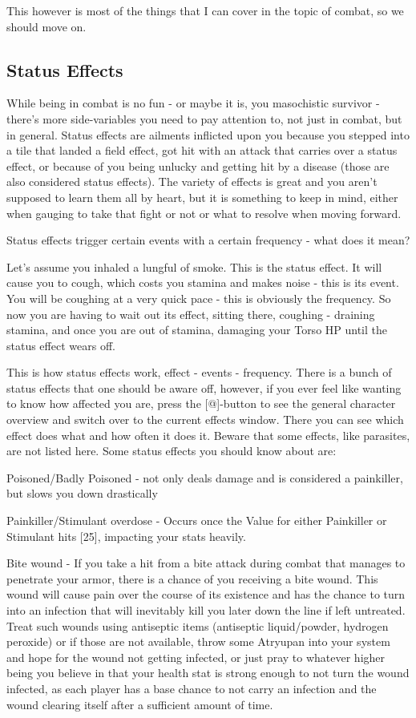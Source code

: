 \documentclass[11pt]{report}
\begin{document}
This however is most of the things that I can cover in the topic of combat, so we should move on.

\subsection{Status Effects}

While being in combat is no fun - or maybe it is, you masochistic survivor - there's more side-variables you need to pay attention to, not just in combat, but in general. Status effects are ailments inflicted upon you because you stepped into a tile that landed a field effect, got hit with an attack that carries over a status effect, or because of you being unlucky and getting hit by a disease (those are also considered status effects). The variety of effects is great and you aren't supposed to learn them all by heart, but it is something to keep in mind, either when gauging to take that fight or not or what to resolve when moving forward.

Status effects trigger certain events with a certain frequency - what does it mean?

Let's assume you inhaled a lungful of smoke. This is the status effect. It will cause you to cough, which costs you stamina and makes noise - this is its event. You will be coughing at a very quick pace - this is obviously the frequency. So now you are having to wait out its effect, sitting there, coughing - draining stamina, and once you are out of stamina, damaging your Torso HP until the status effect wears off.

This is how status effects work, effect - events - frequency. There is a bunch of status effects that one should be aware off, however, if you ever feel like wanting to know how affected you are, press the [@]-button to see the general character overview and switch over to the current effects window. There you can see which effect does what and how often it does it. Beware that some effects, like parasites, are not listed here. Some status effects you should know about are:

Poisoned/Badly Poisoned - not only deals damage and is considered a painkiller, but slows you down drastically

Painkiller/Stimulant overdose - Occurs once the Value for either Painkiller or Stimulant hits [25], impacting your stats heavily.

Bite wound - If you take a hit from a bite attack during combat that manages to penetrate your armor, there is a chance of you receiving a bite wound. This wound will cause pain over the course of its existence and has the chance to turn into an infection that will inevitably kill you later down the line if left untreated. Treat such wounds using antiseptic items (antiseptic liquid/powder, hydrogen peroxide) or if those are not available, throw some Atryupan into your system and hope for the wound not getting infected, or just pray to whatever higher being you believe in that your health stat is strong enough to not turn the wound infected, as each player has a base chance to not carry an infection and the wound clearing itself after a sufficient amount of time.
\end{document}

